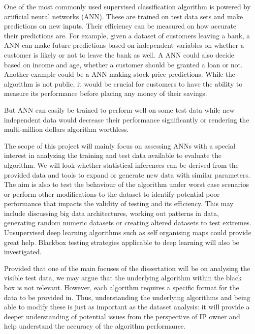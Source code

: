 \documentclass[proposal]{softeng}
\begin{document}
One of the most commonly used supervised classification algorithm is powered by artificial neural networks (ANN). These are trained on test data sets and make predictions on new inputs. Their efficiency can be measured on how accurate their predictions are. For example, given a dataset of customers leaving a bank, a ANN can make future predictions based on independent variables on whether a customer is likely or not to leave the bank as well. A ANN could also decide based on income and age, whether a customer should be granted a loan or not. Another example could be a ANN making stock price predictions. While the algorithm is not public, it would be crucial for customers to have the ability to measure its performance before placing any money of their savings.

But ANN can easily be trained to perform well on some test data while new independent data would decrease their performance significantly or rendering the multi-million dollars algorithm worthless.

The scope of this project will mainly focus on assessing ANNs with a special interest in analyzing the training and test data available to evaluate the algorithm. We will look whether statistical inferences can be derived from the provided data and tools to expand or generate new data with similar parameters. The aim is also to test the behaviour of the algorithm under worst case scenarios or perform other modifications to the dataset to identify potential poor performance that impacts the validity of testing and its efficiency. This may include discussing big data architectures, working out patterns in data, generating random numeric datasets or creating altered datasets to test extremes. Unsupervised deep learning algorithms such as self organising maps could provide great help. Blackbox testing strategies applicable to deep learning will also be investigated. 

Provided that one of the main focuses of the dissertation will be on analysing the visible test data, we may argue that the underlying algorithm within the black box is not relevant. However, each algorithm requires a specific format for the data to be provided in. Thus, understanding the underlying algorithms and being able to modify these is just as important as the dataset analysis: it will provide a deeper understanding of potential issues from the perspective of IP owner and help understand the accuracy of the algorithm performance.
\end{document}
